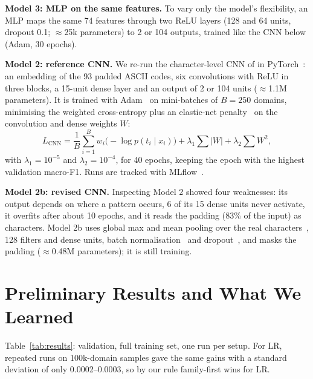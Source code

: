 \documentclass[11pt]{article}
\begin{document}
\textbf{Model 3: MLP on the same features.} To vary only the model's flexibility,
an MLP maps the same 74 features through two ReLU layers (128 and 64 units, dropout
0.1; $\approx$25k parameters) to 2 or 104 outputs, trained like the CNN below
(Adam, 30 epochs).

\textbf{Model 2: reference CNN.} We re-run the character-level CNN of
\citet{gregorio2024incremental} in PyTorch~\cite{paszke2019pytorch}: an embedding
of the 93 padded ASCII codes, six convolutions with ReLU in three blocks, a
15-unit dense layer and an output of 2 or 104 units ($\approx$1.1M parameters).
It is trained with Adam~\cite{kingma2015adam} on mini-batches of $B = 250$
domains, minimising the weighted cross-entropy plus an elastic-net
penalty~\cite{zou2005elasticnet} on the convolution and dense weights $W$:
\begin{equation}
L_{\text{CNN}} = \frac{1}{B}\sum_{i=1}^{B} w_i \big(-\log p(t_i \mid x_i)\big)
+ \lambda_1 \sum |W| + \lambda_2 \sum W^2,
\end{equation}
with $\lambda_1 = 10^{-5}$ and $\lambda_2 = 10^{-4}$, for 40 epochs, keeping the epoch
with the highest validation macro-F1. Runs are tracked with
MLflow~\cite{zaharia2018mlflow}.

\textbf{Model 2b: revised CNN.} Inspecting Model 2 showed four weaknesses: its
output depends on where a pattern occurs, 6 of its 15 dense units never activate,
it overfits after about 10 epochs, and it reads the padding (83\% of the input)
as characters. Model 2b uses global max and mean pooling over the real
characters~\cite{kim2014cnn}, 128 filters and dense units, batch
normalisation~\cite{ioffe2015batchnorm} and dropout~\cite{srivastava2014dropout},
and masks the padding ($\approx$0.48M parameters); it is still training.

\section{Preliminary Results and What We Learned}
Table~\ref{tab:results}: validation, full training set, one run per setup. For LR,
repeated runs on 100k-domain samples gave the same gains with a standard deviation of
only 0.0002--0.0003, so by our rule family-first wins for LR.
\end{document}

